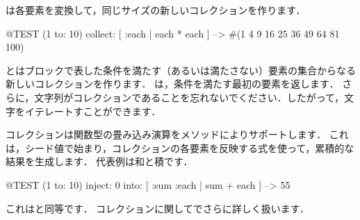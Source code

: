\documentclass[a4paper,10pt,twoside]{book}
\begin{document}

は各要素を変換して，同じサイズの新しいコレクションを作ります．
\begin{code}{@TEST}
(1 to: 10) collect: [ :each | each * each ] --> #(1 4 9 16 25 36 49 64 81 100)
\end{code}

とはブロックで表した条件を満たす（あるいは満たさない）要素の集合からなる新しいコレクションを作ります．
は，条件を満たす最初の要素を返します．
さらに，文字列がコレクションであることを忘れないでください．したがって，文字をイテレートすことができます．


コレクションは関数型の畳み込み演算をメソッドによりサポートします．
これは，シード値で始まり，コレクションの各要素を反映する式を使って，累積的な結果を生成します．
代表例は和と積です．


\begin{code}{@TEST}
(1 to: 10) inject: 0 into: [ :sum :each | sum + each ] --> 55
\end{code}

\noindent
これはと同等です．
コレクションに関してでさらに詳しく扱います．
\end{document}

